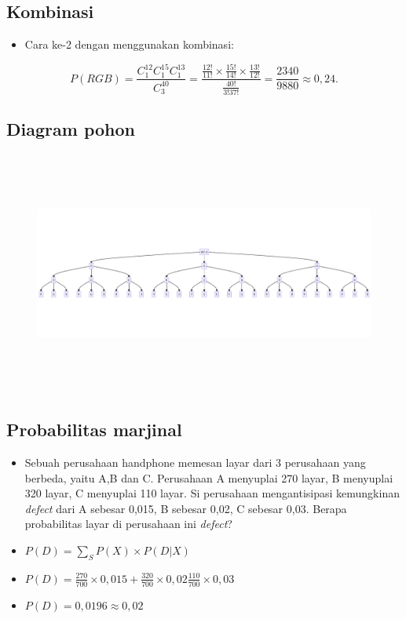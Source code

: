 \documentclass[
  letterpaper,
  DIV=11,
  numbers=noendperiod]{scrartcl}
\providecommand{\tightlist}{%
  \setlength{\itemsep}{0pt}\setlength{\parskip}{0pt}}\usepackage{longtable,booktabs,array}
\begin{document}
\hypertarget{kombinasi-2}{%
\subsection{Kombinasi}\label{kombinasi-2}}

\begin{itemize}
\tightlist
\item
  Cara ke-2 dengan menggunakan kombinasi:
\end{itemize}

\[
P(RGB)=\frac{C^{12}_1C^{15}_1C^{13}_1}{C^{40}_3}=\frac{\frac{12!}{11!}\times\frac{15!}{14!}\times\frac{13!}{12!}}{\frac{40!}{3!37!}}=\frac{2340}{9880}\approx0,24.
\]

\hypertarget{diagram-pohon}{%
\subsection{Diagram pohon}\label{diagram-pohon}}

\begin{figure}[H]

{\centering \includegraphics[width=20.66in,height=3.15in]{index_files/figure-latex/mermaid-figure-1.png}

}

\end{figure}

\hypertarget{probabilitas-marjinal}{%
\subsection{Probabilitas marjinal}\label{probabilitas-marjinal}}

\begin{itemize}
\item
  Sebuah perusahaan handphone memesan layar dari 3 perusahaan yang
  berbeda, yaitu A,B dan C. Perusahaan A menyuplai 270 layar, B
  menyuplai 320 layar, C menyuplai 110 layar. Si perusahaan
  mengantisipasi kemungkinan \emph{defect} dari A sebesar 0,015, B
  sebesar 0,02, C sebesar 0,03. Berapa probabilitas layar di perusahaan
  ini \emph{defect}?
\item
  \(P(D)=\sum_S P(X) \times P(D|X)\)
\item
  \(P(D)=\frac{270}{700} \times 0,015 + \frac{320}{700} \times 0,02 \frac{110}{700} \times 0,03\)
\item
  \(P(D)=0,0196 \approx 0,02\)
\end{itemize}
\end{document}
